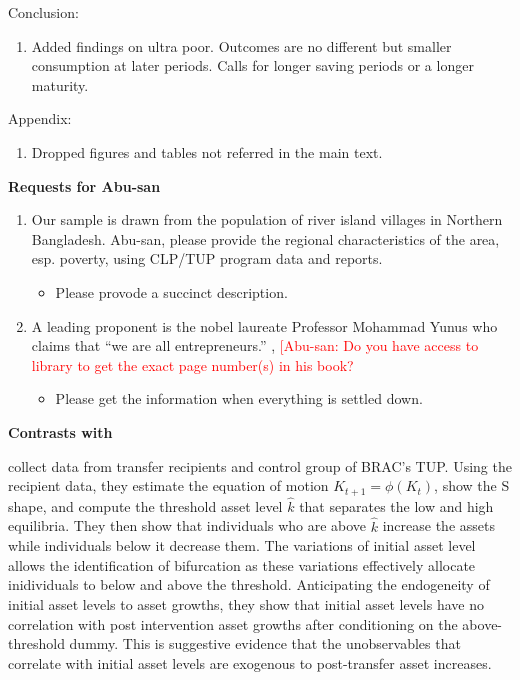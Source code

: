 Conclusion:
\begin{enumerate}
\vspace{1.0ex}\setlength{\itemsep}{1.0ex}\setlength{\baselineskip}{12pt}
\item	Added findings on ultra poor. Outcomes are no different but smaller consumption at later periods. Calls for longer saving periods or a longer maturity.
\end{enumerate}
Appendix:
\begin{enumerate}
\vspace{1.0ex}\setlength{\itemsep}{1.0ex}\setlength{\baselineskip}{12pt}
\item	Dropped figures and tables not referred in the main text.
\end{enumerate}
\textbf{Requests for Abu-san}
\begin{enumerate}
\vspace{1.0ex}\setlength{\itemsep}{1.0ex}\setlength{\baselineskip}{12pt}
\item		Our sample is drawn from the population of river island villages in Northern Bangladesh. Abu-san, please provide the regional characteristics of the area, esp. poverty, using CLP/TUP program data and reports. 
	\begin{itemize}
	\vspace{1.0ex}\setlength{\itemsep}{1.0ex}\setlength{\baselineskip}{12pt}
	\item	Please provode a succinct description.
	\end{itemize}
\item	A leading proponent is the nobel laureate Professor Mohammad Yunus who claims that ``we are all entrepreneurs.'' \citet{Yunus2003}, \citet{Cosic2017} \textcolor{red}{[Abu-san: Do you have access to library to get the exact page number(s) in his book?}
	\begin{itemize}
	\vspace{1.0ex}\setlength{\itemsep}{1.0ex}\setlength{\baselineskip}{12pt}
	\item	Please get the information when everything is settled down.
	\end{itemize}
\end{enumerate}


\textbf{\textbf{Contrasts with \citet{Balboni2020}}}
\setlength{\parindent}{1em}

	\citet{Balboni2020} collect data from transfer recipients and control group of BRAC's TUP. Using the recipient data, they estimate the equation of motion $K_{t+1}=\phi(K_{t})$, show the S shape, and compute the threshold asset level $\hat{k}$ that separates the low and high equilibria. They then show that individuals who are above $\hat{k}$ increase the assets while individuals below it decrease them. The variations of initial asset level allows the identification of bifurcation as these variations effectively allocate inidividuals to below and above the threshold. Anticipating the endogeneity of initial asset levels to asset growths, they show that initial asset levels have no correlation with post intervention asset growths after conditioning on the above-threshold dummy. This is suggestive evidence that the unobservables that correlate with initial asset levels are exogenous to post-transfer asset increases.

